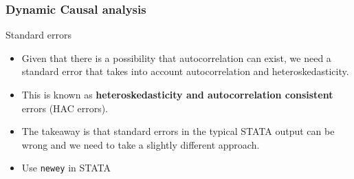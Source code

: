 \begin{frame}
\frametitle{Dynamic Causal analysis}
Standard errors
\begin{itemize}
\item Given that there is a possibility that autocorrelation can exist, we need a standard error that takes into account autocorrelation and heteroskedasticity. 
\item This is known as \textbf{heteroskedasticity and autocorrelation consistent} errors (HAC errors). 
\item The takeaway is that standard errors in the typical STATA output can be wrong and we need to take a slightly different approach.
\item Use \texttt{newey} in STATA 
\end{itemize}
\end{frame}

